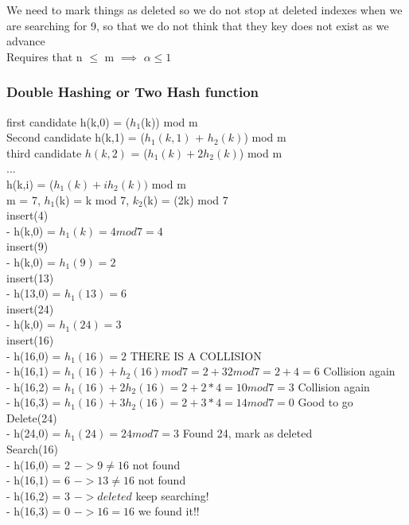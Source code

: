 \documentclass[12pt]{article}
\begin{document}
	We need to mark things as deleted so we do not stop at deleted indexes when we are searching for 9, so that we do not think that they key does not exist as we advance\\
	
	Requires that n $\leq$ m $\implies$ $\alpha \leq 1$\\
	
	\subsubsection*{Double Hashing or Two Hash function}
	
	first candidate h(k,0) = ($h_1$(k)) mod m\\
	Second candidate h(k,1) = ($h_1(k,1)$ + $h_2(k)$) mod m\\
	third candidate $h(k,2)$ = ($h_1(k) + 2h_2(k)$) mod m\\ 
	...\\
	h(k,i) = ($h_1(k) + ih_2(k))$ mod m\\
	
	m = 7, $h_1$(k) = k mod 7, $k_2$(k) = (2k) mod 7\\
	
	insert(4)\\
	- h(k,0) = $h_1(k) = 4 mod 7 = 4$\\
	insert(9)\\
	- h(k,0) = $h_1(9) = 2$\\
	insert(13) \\
	- h(13,0) = $h_1(13) = 6$\\
	insert(24) \\
	- h(k,0) = $h_1(24) = 3$\\
	insert(16)\\
	- h(16,0) = $h_1(16) = 2$ THERE IS A COLLISION\\
	- h(16,1) = $h_1(16) + h_2(16) mod 7 = 2 + 32 mod 7 = 2 + 4 = 6$ Collision again\\
	- h(16,2) = $h_1(16) + 2h_2(16) = 2 + 2 * 4 = 10 mod 7 = 3$ Collision again\\
	- h(16,3) = $h_1(16) + 3h_2(16) = 2 + 3 * 4 = 14 mod 7 = 0$ Good to go\\
	
	Delete(24)\\
	- h(24,0) = $h_1(24) = 24 mod 7 = 3$ Found 24, mark as deleted\\
	Search(16)\\
	- h(16,0) = 2 $-> 9 \neq 16$ not found\\
	- h(16,1) = 6 $-> 13 \neq 16$ not found\\
	- h(16,2) = 3 $-> deleted$ keep searching!\\
	- h(16,3) = 0 $-> 16 = 16$ we found it!!\\
	
\end{document}
